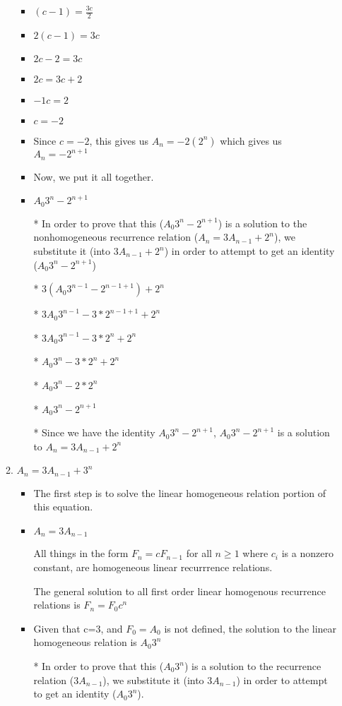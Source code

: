 \documentclass{article}
\begin{document}
\begin{enumerate}
\begin{enumerate}
\begin{itemize}
    \item $(c-1)=\frac{3c}{2}$
    \item $2(c-1)=3c$
    \item $2c-2=3c$
    \item $2c=3c+2$
    \item $-1c=2$
    \item $c=-2$
    \item Since $c=-2$, this gives us $A_{n}=-2(2^{n})$ which gives us $A_{n}=-2^{n+1}$
    \item Now, we put it all together.
    \item $A_{0}3^{n}-2^{n+1}$
    \item [*] In order to prove that this ($A_{0}3^{n}-2^{n+1}$) is a solution to the nonhomogeneous recurrence relation ($A_{n}=3A_{n-1}+2^{n}$), we substitute it (into $3A_{n-1}+2^{n}$) in order to attempt to get an identity ($A_{0}3^{n}-2^{n+1}$)
    \item [*] $3(A_{0}3^{n-1}-2^{n-1+1})+2^{n}$
    \item [*] $3A_{0}3^{n-1}-3*2^{n-1+1}+2^{n}$
    \item [*] $3A_{0}3^{n-1}-3*2^{n}+2^{n}$
    \item [*] $A_{0}3^{n}-3*2^{n}+2^{n}$
    \item [*] $A_{0}3^{n}-2*2^{n}$
    \item [*] $A_{0}3^{n}-2^{n+1}$
    \item [*] Since we have the identity $A_{0}3^{n}-2^{n+1}$, $A_{0}3^{n}-2^{n+1}$ is a solution to $A_{n}=3A_{n-1}+2^{n}$
    \end{itemize} %
  \item $A_{n}=3A_{n-1}+3^{n}$
    \begin{itemize} %
    \item The first step is to solve the linear homogeneous relation portion of this equation.
    \item $A_{n}=3A_{n-1}$
    \item [] All things in the form $F_{n}=cF_{n-1}$ for all $n\geq1$ where $c_{i}$ is a nonzero constant, are homogeneous linear recurrrence relations.
    \item [] The general solution to all first order linear homogenous recurrence relations is $F_{n}=F_{0}c^{n}$
    \item Given that c=3, and $F_{0}=A_{0}$ is not defined, the solution to the linear homogeneous relation is $A_{0}3^{n}$
    \item [*] In order to prove that this ($A_{0}3^{n}$) is a solution to the recurrence relation ($3A_{n-1}$), we substitute it (into $3A_{n-1}$) in order to attempt to get an identity ($A_{0}3^{n}$).

\end{itemize}
\end{enumerate}
\end{enumerate}
\end{document}
